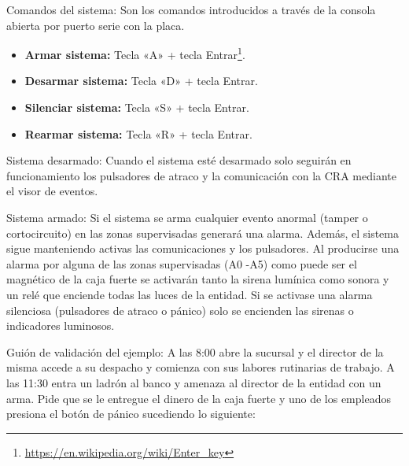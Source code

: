 \begin{definitionlist}
\item[Comandos del sistema:] Son los comandos introducidos a través de la consola abierta por puerto serie con la placa.

\begin{itemize}
\item \textbf{Armar sistema:} Tecla «A» + tecla Entrar\footnote{\url{https://en.wikipedia.org/wiki/Enter_key}}.
\item \textbf{Desarmar sistema:} Tecla «D» + tecla Entrar.
\item \textbf{Silenciar sistema:} Tecla «S» + tecla Entrar.
\item \textbf{Rearmar sistema:} Tecla «R» + tecla Entrar.
\end{itemize}

\item[Sistema desarmado:] Cuando el sistema esté desarmado solo seguirán en funcionamiento los pulsadores de atraco y la comunicación con la \acs{CRA} mediante el visor de eventos. 

\item[Sistema armado:] Si el sistema se arma cualquier evento anormal (tamper o cortocircuito) en las zonas supervisadas generará una alarma. Además, el sistema sigue manteniendo activas las comunicaciones y los pulsadores. Al producirse una alarma por alguna de las zonas supervisadas (A0 -A5) como puede ser el magnético de la caja fuerte se activarán tanto la sirena lumínica como sonora y un relé que enciende todas las luces de la entidad. Si se activase una alarma silenciosa (pulsadores de atraco o pánico) solo se encienden las sirenas o indicadores luminosos.

\item[Guión de validación del ejemplo:] A las 8:00 abre la sucursal y el director de la misma accede a su despacho y comienza con sus labores rutinarias de trabajo. A las 11:30 entra un ladrón al banco y amenaza al director de la entidad con un arma. Pide que se le entregue el dinero de la caja fuerte y uno de los empleados presiona el botón de pánico sucediendo lo siguiente:


\end{definitionlist}
